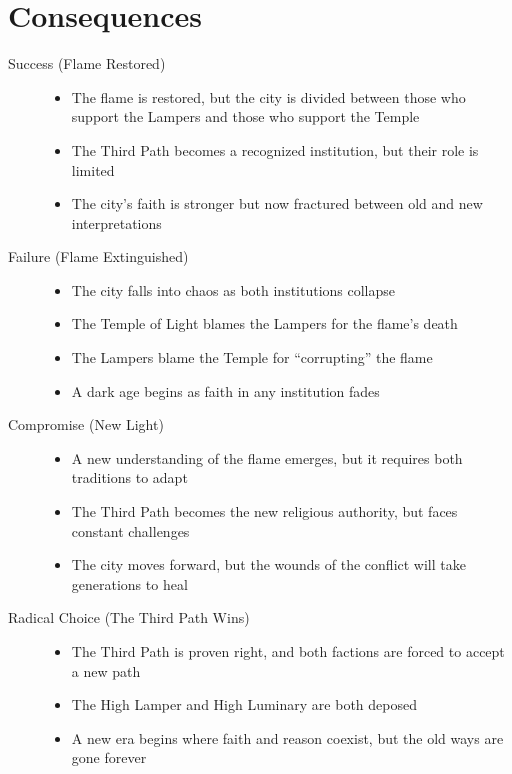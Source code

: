 \documentclass[12pt]{article}
\begin{document}
\section{Consequences}

\begin{description}
    \item[Success (Flame Restored)]
    \begin{itemize}
        \item The flame is restored, but the city is divided between those who support the Lampers and those who support the Temple
        \item The Third Path becomes a recognized institution, but their role is limited
        \item The city's faith is stronger but now fractured between old and new interpretations
    \end{itemize}
    
    \item[Failure (Flame Extinguished)]
    \begin{itemize}
        \item The city falls into chaos as both institutions collapse
        \item The Temple of Light blames the Lampers for the flame's death
        \item The Lampers blame the Temple for ``corrupting'' the flame
        \item A dark age begins as faith in any institution fades
    \end{itemize}
    
    \item[Compromise (New Light)]
    \begin{itemize}
        \item A new understanding of the flame emerges, but it requires both traditions to adapt
        \item The Third Path becomes the new religious authority, but faces constant challenges
        \item The city moves forward, but the wounds of the conflict will take generations to heal
    \end{itemize}
    
    \item[Radical Choice (The Third Path Wins)]
    \begin{itemize}
        \item The Third Path is proven right, and both factions are forced to accept a new path
        \item The High Lamper and High Luminary are both deposed
        \item A new era begins where faith and reason coexist, but the old ways are gone forever
    \end{itemize}
\end{description}
\end{document}
